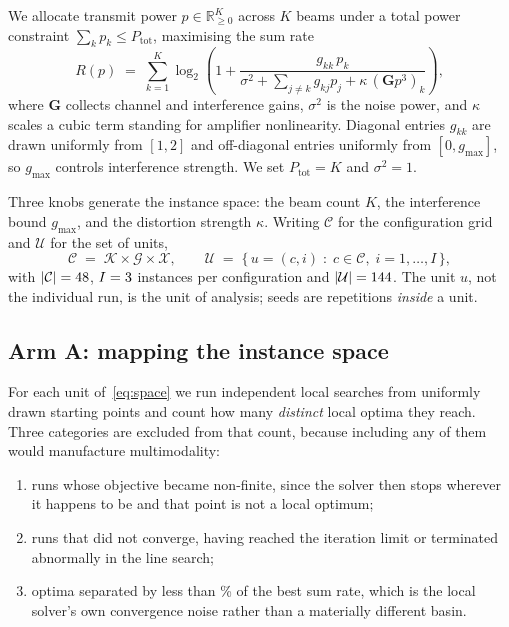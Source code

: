 \documentclass[runningheads]{llncs}
\begin{document}
We allocate transmit power $p \in \mathbb{R}^K_{\ge 0}$ across $K$ beams under a total power
constraint $\sum_k p_k \le P_{\mathrm{tot}}$, maximising the sum rate
\begin{equation}
  R(p) \;=\; \sum_{k=1}^{K} \log_2\!\left(1 + \frac{g_{kk}\,p_k}
       {\sigma^2 + \sum_{j\neq k} g_{kj} p_j + \kappa \,(\mathbf{G}p^{3})_k}\right),
  \label{eq:sumrate}
\end{equation}
where $\mathbf{G}$ collects channel and interference gains, $\sigma^2$ is the noise power, and
$\kappa$ scales a cubic term standing for amplifier nonlinearity. Diagonal entries $g_{kk}$ are
drawn uniformly from $[1,2]$ and off-diagonal entries uniformly from $[0, g_{\max}]$, so
$g_{\max}$ controls interference strength. We set $P_{\mathrm{tot}} = K$ and $\sigma^2 = 1$.

Three knobs generate the instance space: the beam count $K$, the interference bound $g_{\max}$,
and the distortion strength $\kappa$. Writing $\mathcal{C}$ for the configuration grid and
$\mathcal{U}$ for the set of units,
\begin{equation}
  \mathcal{C} \;=\; \mathcal{K}\times\mathcal{G}\times\mathcal{X},
  \qquad
  \mathcal{U} \;=\; \{\, u=(c,i) \;:\; c\in\mathcal{C},\; i=1,\dots,I \,\},
  \label{eq:space}
\end{equation}
with $|\mathcal{C}|=48$, $I=3$ instances per configuration and
$|\mathcal{U}|=144$. The unit $u$, not the individual run, is the unit of analysis; seeds
are repetitions \emph{inside} a unit.

\subsection{Arm A: mapping the instance space}

For each unit of~\eqref{eq:space} we run \numStarts{} independent local searches from uniformly
drawn starting points and count how many \emph{distinct} local optima they reach. Three categories are excluded from
that count, because including any of them would manufacture multimodality:

\begin{enumerate}
\item runs whose objective became non-finite, since the solver then stops wherever it happens to
      be and that point is not a local optimum;
\item runs that did not converge, having reached the iteration limit or terminated abnormally in
      the line search;
\item optima separated by less than \numMinSpread\% of the best sum rate, which is the local
      solver's own convergence noise rather than a materially different basin.
\end{enumerate}
\end{document}
